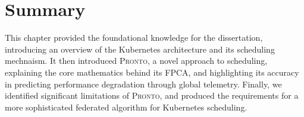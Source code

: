 \section{Summary}
This chapter provided the foundational knowledge for the dissertation,
introducing an overview of the Kubernetes architecture and its scheduling
mechnaism. It then introduced \textsc{Pronto}, a novel approach to scheduling,
explaining the core mathematics behind its FPCA, and highlighting its accuracy
in predicting performance degradation through global telemetry. Finally, we
identified significant limitations of \textsc{Pronto}, and produced the
requirements for a more sophisticated federated algorithm for Kubernetes scheduling.

